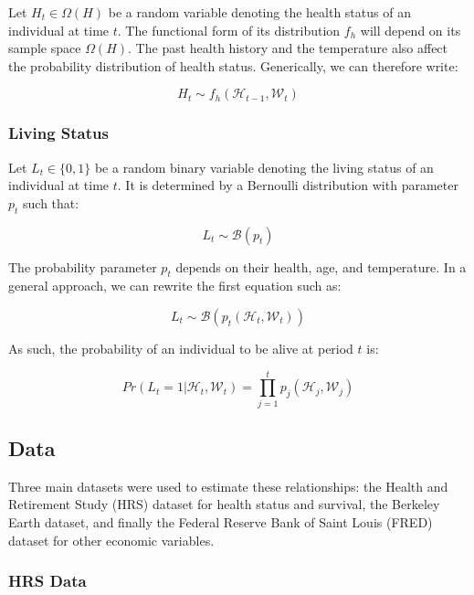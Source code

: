 \documentclass{article}
\begin{document}
Let $H_{t}\in\Omega(H)$ be a random variable denoting the health status of an individual at time $t$.
The functional form of its distribution $f_{h}$ will depend on its sample space $\Omega(H)$. 
The past health history and the temperature also affect the probability distribution of health status.
Generically, we can therefore write: 

\begin{equation}
    H_{t}\sim f_{h}(\mathcal{H}_{t-1},\mathcal{W}_t)
\end{equation}


\subsubsection{Living Status}

Let $L_{t}\in\{0,1\}$ be a random binary variable denoting the living status of an individual at time $t$.
It is determined by a Bernoulli distribution with parameter $p_t$ such that: 

\begin{equation}
    L_{t} \sim \mathcal{B}(p_{t})
\end{equation}

The probability parameter $p_{t}$ depends on their health, age, and temperature.
In a general approach, we can rewrite the first equation such as: 

\begin{equation}
    L_{t} \sim \mathcal{B}(p_{t}(\mathcal{H}_t,\mathcal{W}_t))
\end{equation}

As such, the probability of an individual to be alive at period $t$ is: 

\begin{equation}
    Pr(L_t = 1 | \mathcal{H}_t,\mathcal{W}_t ) = \prod_{j = 1}^{t} p_{j}(\mathcal{H}_j,\mathcal{W}_j)
\end{equation}

\subsection{Data}

Three main datasets were used to estimate these relationships: 
the Health and Retirement Study (HRS) dataset for
health status and survival,
the Berkeley Earth dataset,
and finally the Federal Reserve Bank of Saint Louis (FRED) dataset for 
other economic variables.

\subsubsection{HRS Data}
\end{document}
